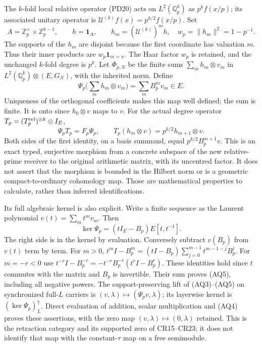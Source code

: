 The $k$-fold local relative operator (PD20) acts on
$L^2(\mathbb Q_p^k)$ as $p^k f(x/p)$; its associated unitary operator
is $\mathscr U^{(k)}f(x)=p^{k/2}f(x/p)$. Set
\[
 A=\mathbb Z_p^\times\times\mathbb Z_p^{k-1},\qquad
 h=\mathbf1_A,\qquad h_m=(\mathscr U^{(k)})^mh,
 \quad w_p=\|h_m\|^2=1-p^{-1}.
 \tag{AQ2}
\]
The supports of the $h_m$ are disjoint because the first coordinate
has valuation $m$. Thus their inner products are
$w_p\mathbf1_{m=n}$. The Haar factor $w_p$ is retained, and the
unchanged $k$-fold degree is $p^k$.
Let $\Phi_{p,N}$ be the finite sums $\sum_m h_m\otimes v_m$ in
$L^2(\mathbb Q_p^k)\otimes(E,G_N)$, with the inherited norm. Define
\[
 \Psi_p\Big(\sum_mh_m\otimes v_m\Big)
       =\sum_m B_p^m v_m\in E.
 \tag{AQ3}
\]
Uniqueness of the orthogonal coefficients makes this map well defined;
the sum is finite. It is onto since $h_0\otimes v$ maps to $v$.
For the actual degree operator $T_p=(T_p^{\rm rel})^{\otimes k}\otimes I_E$,
\[
 \Psi_p T_p=F_p\Psi_p,\qquad
 T_p(h_m\otimes v)=p^{k/2}h_{m+1}\otimes v.
 \tag{AQ4}
\]
Both sides of the first identity, on a basis summand, equal
$p^{k/2}B_p^{m+1}v$. This is an exact typed, surjective morphism from
a concrete subspace of the new relative-prime receiver to the original
arithmetic matrix, with its uncentred factor. It does not assert that
the morphism is bounded in the Hilbert norm or is a geometric
compact-to-ordinary cohomology map. Those are mathematical properties
to calculate, rather than inferred identifications.

Its full algebraic kernel is also explicit. Write a finite sequence as
the Laurent polynomial $v(t)=\sum_m t^m v_m$. Then
\[
 \ker\Psi_p=(tI_E-B_p)E[t,t^{-1}].
 \tag{AQ5}
\]
The right side is in the kernel by evaluation. Conversely subtract
$v(B_p)$ from $v(t)$ term by term. For $m>0$,
$t^mI-B_p^m=(tI-B_p)\sum_{j=0}^{m-1}t^{m-1-j}B_p^j$.
For $m=-r<0$ use
$t^{-r}I-B_p^{-r}=-t^{-r}B_p^{-r}(t^rI-B_p^r)$.
These identities hold since $t$ commutes with the matrix and $B_p$
is invertible. Their sum proves (AQ5), including all negative powers.
The support-preserving lift of (AQ3)--(AQ5) on synchronized full-$L$
carriers is $(v,\lambda)\mapsto(\Psi_pv,\lambda)$; its layerwise
kernel is $(\ker\Psi_p)^\uparrow_L$. Direct evaluation of addition,
scalar multiplication and (AQ4) proves these assertions, with the
zero map $(v,\lambda)\mapsto(0,\lambda)$ retained. This is the
retraction category and its supported zero of CR15--CR23; it does not
identify that map with the constant-$\tau$ map on a free semimodule.


